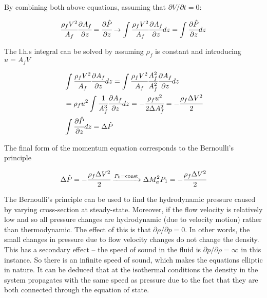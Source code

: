 \documentclass[../Article_Model_Parameters.tex]{subfiles}
\begin{document}
	By combining both above equations, assuming that $\partial V / \partial t = 0$:
	
	{\footnotesize
		\begin{equation*}
			\cfrac{\rho_f V^2}{A_f} \cfrac{\partial A_f}{\partial z} = \cfrac{\partial \hat{P}}{\partial z} \rightarrow \int	\cfrac{\rho_f V^2}{A_f} \cfrac{\partial A_f}{\partial z} dz = \int \cfrac{\partial\hat{P}}{\partial z} dz
		\end{equation*}
	}
	
	The l.h.s integral can be solved by assuming $\rho_f$ is constant and introducing $u=A_f V$
	
	{\footnotesize
		\begin{align*}
			& \int	\cfrac{\rho_f V^2}{A_f} \cfrac{\partial A_f}{\partial z} dz = \int	\cfrac{\rho_f V^2}{A_f} \cfrac{A_f^2}{A_f^2} \cfrac{\partial A_f}{\partial z} dz \\
			&= \rho_f u^2  \int \cfrac{1}{A_f^3} \cfrac{\partial A_f}{\partial z} dz = - \cfrac{\rho_f u^2}{2 \Delta A_f^2} = - \cfrac{\rho_f \Delta V^2}{2} \\
			& \int \cfrac{\partial \hat{P}}{\partial z} dz = \Delta \hat{P}
		\end{align*}
	}
	
	The final form of the momentum equation corresponds to the Bernoulli's principle
	
	{\footnotesize
		\begin{equation*}
			\Delta \hat{P} = - \cfrac{\rho_f \Delta V^2}{2} \xrightarrow[]{P_0 = \text{const}} \Delta M_a^2 P_1 = - \cfrac{\rho_f \Delta V^2}{2}
		\end{equation*}
	}

	The Bernoulli's principle can be used to find the hydrodynamic pressure caused by varying cross-section at steady-state. Moreover, if the flow velocity is relatively low and so all pressure changes are hydrodynamic (due to velocity motion) rather than thermodynamic. The effect of this is that $\partial \rho / \partial p = 0$. In other words, the small changes in pressure due to flow velocity changes do not change the density. This has a secondary effect -- the speed of sound in the fluid is $\partial p/\partial \rho = \infty$	in this instance. So there is an infinite speed of sound, which makes the equations elliptic in nature. It can be deduced that at the isothermal conditions the density in the system propagates with the same speed as pressure due to the fact that they are both connected through the equation of state. 
	
	
	
	
	
	
	
	
	
	
\end{document}
